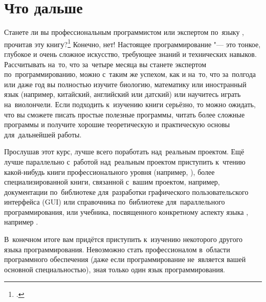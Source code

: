 
\chapter{Что дальше}
Станете ли вы профессиональным программистом или экспертом по~языку , прочитав эту книгу?\footcite[Текст взят из~подраздела 0.1.3]{Stroustrup:2016:ru} Конечно, нет! Настоящее программирование "--- это тонкое, глубокое и очень сложное искусство, требующее знаний и технических навыков. Рассчитывать на~то, что за~четыре месяца вы станете экспертом по~программированию, можно с~таким же успехом, как и на~то, что за~полгода или даже год вы полностью изучите биологию, математику или иностранный язык (например, китайский, английский или датский) или научитесь играть на~виолончели. Если подходить к~изучению книги серьёзно, то можно ожидать, что вы сможете писать простые полезные программы, читать более сложные программы и получите хорошие теоретическую и практическую основы для~дальнейшей работы.

Прослушав этот курс, лучше всего поработать над~реальным проектом. Ещё лучше параллельно с~работой над~реальным проектом приступить к~чтению какой-нибудь книги профессионального уровня (например, \textcite{Stroustrup:2013:en}), более специализированной книги, связанной с~вашим проектом, например, документации по~библиотеке  для~разработки графического пользовательского интерфейса (GUI) или справочника по~библиотеке  для~параллельного программирования, или учебника, посвященного конкретному аспекту языка , например \textcite{Koenig:2002:ru, Sutter:2008:ru, Gamma:2004:ru}.

В~конечном итоге вам придётся приступить к~изучению некоторого другого языка программирования. Невозможно стать профессионалом в~области программного обеспечения (даже если программирование не~является вашей основной специальностью), зная только один язык программирования.
